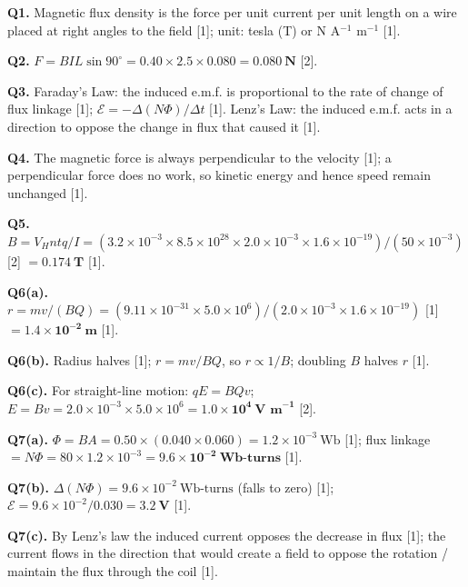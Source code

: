 \begin{markscheme}

\textbf{Q1.} Magnetic flux density is the force per unit current per unit length on a wire placed at right angles to the field [1]; unit: tesla (T) or N A$^{-1}$ m$^{-1}$ [1].

\vspace{0.5em}\textbf{Q2.} $F = BIL\sin 90^\circ = 0.40 \times 2.5 \times 0.080 = \mathbf{0.080\ \text{N}}$ [2].

\vspace{0.5em}\textbf{Q3.} Faraday's Law: the induced e.m.f. is proportional to the rate of change of flux linkage [1]; $\mathcal{E} = -\Delta(N\Phi)/\Delta t$ [1]. Lenz's Law: the induced e.m.f. acts in a direction to oppose the change in flux that caused it [1].

\vspace{0.5em}\textbf{Q4.} The magnetic force is always perpendicular to the velocity [1]; a perpendicular force does no work, so kinetic energy and hence speed remain unchanged [1].

\vspace{0.5em}\textbf{Q5.} $B = V_H ntq / I = (3.2\times10^{-3} \times 8.5\times10^{28} \times 2.0\times10^{-3} \times 1.6\times10^{-19}) / (50\times10^{-3})$ [2] $= \mathbf{0.174\ \text{T}}$ [1].

\vspace{0.5em}\textbf{Q6(a).} $r = mv/(BQ) = (9.11\times10^{-31}\times5.0\times10^6)/(2.0\times10^{-3}\times1.6\times10^{-19})$ [1] $= \mathbf{1.4\times10^{-2}\ \text{m}}$ [1].

\vspace{0.5em}\textbf{Q6(b).} Radius halves [1]; $r = mv/BQ$, so $r \propto 1/B$; doubling $B$ halves $r$ [1].

\vspace{0.5em}\textbf{Q6(c).} For straight-line motion: $qE = BQv$; $E = Bv = 2.0\times10^{-3}\times5.0\times10^6 = \mathbf{1.0\times10^4\ \text{V m}^{-1}}$ [2].

\vspace{0.5em}\textbf{Q7(a).} $\Phi = BA = 0.50\times(0.040\times0.060) = 1.2\times10^{-3}\ \text{Wb}$ [1]; flux linkage $= N\Phi = 80\times1.2\times10^{-3} = \mathbf{9.6\times10^{-2}\ \text{Wb-turns}}$ [1].

\vspace{0.5em}\textbf{Q7(b).} $\Delta(N\Phi) = 9.6\times10^{-2}\ \text{Wb-turns}$ (falls to zero) [1]; $\mathcal{E} = 9.6\times10^{-2}/0.030 = \mathbf{3.2\ \text{V}}$ [1].

\vspace{0.5em}\textbf{Q7(c).} By Lenz's law the induced current opposes the decrease in flux [1]; the current flows in the direction that would create a field to oppose the rotation / maintain the flux through the coil [1].

\end{markscheme}

